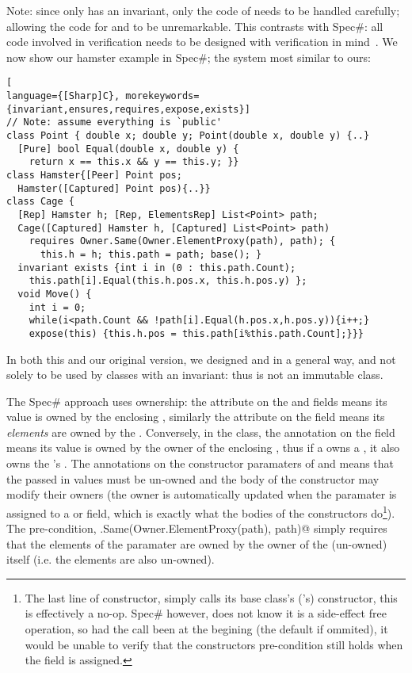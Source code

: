 Note: since only \Q@Cage@ has an invariant,
 only the code of \Q@Cage@ needs to be handled carefully; allowing the code for \Q@Point@ and \Q@Hamster@ to be unremarkable.
 This contrasts with Spec\#: all code involved in  verification needs to be designed with verification in mind~\cite{barnett2011specification}.
We now show our hamster example in Spec\#; the system most similar to ours:
\begin{lstlisting}[
language={[Sharp]C}, morekeywords={invariant,ensures,requires,expose,exists}]
// Note: assume everything is `public'
class Point { double x; double y; Point(double x, double y) {..}
  [Pure] bool Equal(double x, double y) {
    return x == this.x && y == this.y; }}
class Hamster{[Peer] Point pos; 
  Hamster([Captured] Point pos){..}}
class Cage {
  [Rep] Hamster h; [Rep, ElementsRep] List<Point> path;
  Cage([Captured] Hamster h, [Captured] List<Point> path)
    requires Owner.Same(Owner.ElementProxy(path), path); {
      this.h = h; this.path = path; base(); }
  invariant exists {int i in (0 : this.path.Count);
    this.path[i].Equal(this.h.pos.x, this.h.pos.y) };
  void Move() {
    int i = 0;
    while(i<path.Count && !path[i].Equal(h.pos.x,h.pos.y)){i++;}
    expose(this) {this.h.pos = this.path[i%this.path.Count];}}}
\end{lstlisting}

In both this and our original version, we designed \Q@Point@ and \Q@Hamster@ in a general way, and not solely to be used by classes with an invariant: thus \Q@Point@ is not an immutable class.

The Spec\# approach uses ownership: the \Q@Rep@ attribute on the \Q@h@ and \Q@path@ fields means its value is owned by the enclosing \Q@Cage@, similarly the \Q@ElementsRep@ attribute on the \Q@path@ field means its \emph{elements} are owned by the \Q@Cage@. Conversely, in the \Q@Hamster@ class, the \Q@Peer@ annotation on the \Q@pos@ field means its value is owned by the owner of the enclosing \Q@Hamster@, thus if a \Q@Cage@ owns a \Q@Hamster@, it also owns the \Q@Hamster@'s \Q@pos@. The \Q@Captured@ annotations on the constructor paramaters of \Q@Cage@ and \Q@Hamster@ means that the passed in values must be un-owned and the body of the constructor may modify their owners (the owner is automatically updated when the paramater is assigned to a \Q@Rep@ or \Q@Peer@ field, which is exactly what the bodies of the constructors do\footnote{The last line of \Q@Cage@s constructor, \Q@base@ simply calls its base class's (\Q@Object@'s) constructor, this is effectively a no-op. Spec\# however, does not know it is a side-effect free operation, so had the call been at the begining (the default if ommited), it would be unable to verify that the constructors pre-condition still holds when the \Q@path@ field is assigned.}). The pre-condition, \Q@Owner.Same(Owner.ElementProxy(path), path)@ simply requires that the elements of the \Q@path@ paramater are owned by the owner of the (un-owned) \Q@path@ itself (i.e. the elements are also un-owned).


